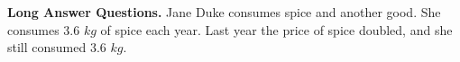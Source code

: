 \documentclass[11pt, a4]{exam}
\begin{document}
\begin{questions}
\begin{parts}
\bigskip

\bigskip

\bigskip

\bigskip

\bigskip

\bigskip

\bigskip

\bigskip

\bigskip

\bigskip



\end{parts}


\newpage
\question \textbf{Long Answer Questions.} Jane Duke consumes spice and another good. She consumes 3.6 $kg$ of spice each year. Last year the price of spice doubled, and she still consumed 3.6 $kg$.







\end{questions}
\end{document}
